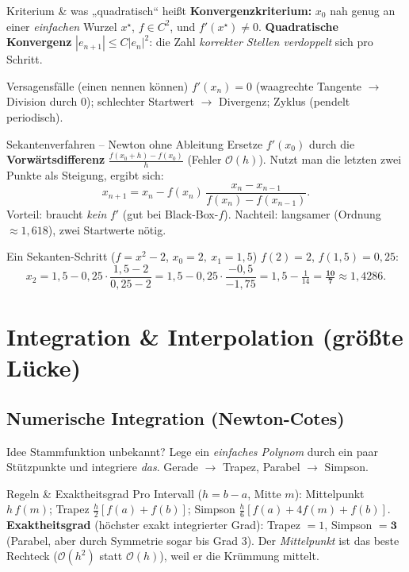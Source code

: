 \documentclass[a4paper,11pt]{article}
\begin{document}
\begin{defi}{Kriterium \& was „quadratisch`` heißt}
\textbf{Konvergenzkriterium:} $x_0$ nah genug an einer \emph{einfachen} Wurzel $x^\star$, $f\in C^2$,
und $f'(x^\star)\neq 0$. \textbf{Quadratische Konvergenz} $|e_{n+1}|\le C|e_n|^2$: die Zahl
\emph{korrekter Stellen verdoppelt} sich pro Schritt.
\end{defi}

\begin{falle}{Versagensfälle (einen nennen können)}
$f'(x_n)=0$ (waagrechte Tangente $\to$ Division durch $0$); schlechter Startwert $\to$ Divergenz;
Zyklus (pendelt periodisch).
\end{falle}

\begin{satz}{Sekantenverfahren -- Newton ohne Ableitung}
Ersetze $f'(x_0)$ durch die \textbf{Vorwärtsdifferenz} $\frac{f(x_0+h)-f(x_0)}{h}$
(Fehler $\mathcal O(h)$). Nutzt man die letzten zwei Punkte als Steigung, ergibt sich:
\[
  x_{n+1}=x_n-f(x_n)\,\frac{x_n-x_{n-1}}{f(x_n)-f(x_{n-1})}.
\]
Vorteil: braucht \emph{kein} $f'$ (gut bei Black-Box-$f$). Nachteil: langsamer (Ordnung $\approx1{,}618$),
zwei Startwerte nötig.
\end{satz}

\begin{bsp}{Ein Sekanten-Schritt ($f=x^2-2$, $x_0=2,\ x_1=1{,}5$)}
$f(2)=2$, $f(1{,}5)=0{,}25$:
\[
x_2=1{,}5-0{,}25\cdot\frac{1{,}5-2}{0{,}25-2}=1{,}5-0{,}25\cdot\frac{-0{,}5}{-1{,}75}
=1{,}5-\tfrac1{14}=\mathbf{\tfrac{10}{7}}\approx1{,}4286.
\]
\end{bsp}

\section{Integration \& Interpolation (größte Lücke)}

\subsection{Numerische Integration (Newton-Cotes)}
\begin{intu}{Idee}
Stammfunktion unbekannt? Lege ein \emph{einfaches Polynom} durch ein paar Stützpunkte und integriere
\emph{das}. Gerade $\to$ Trapez, Parabel $\to$ Simpson.
\end{intu}

\begin{satz}{Regeln \& Exaktheitsgrad}
Pro Intervall ($h=b-a$, Mitte $m$): \quad
Mittelpunkt $h\,f(m)$;\;\; Trapez $\tfrac h2[f(a)+f(b)]$;\;\;
Simpson $\tfrac h6[f(a)+4f(m)+f(b)]$.\\
\textbf{Exaktheitsgrad} (höchster exakt integrierter Grad): Trapez $=1$, Simpson $=\mathbf 3$
(Parabel, aber durch Symmetrie sogar bis Grad 3). Der \emph{Mittelpunkt} ist das beste Rechteck
($\mathcal O(h^2)$ statt $\mathcal O(h)$), weil er die Krümmung mittelt.
\end{satz}
\end{document}
